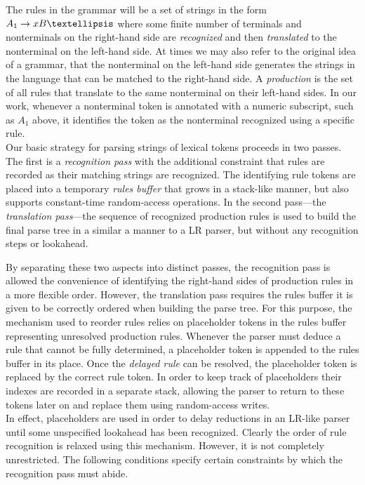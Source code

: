 \documentclass[a4paper,11pt]{article}
\begin{document}
The rules in the grammar will be a set of strings in the form $A_1 \rightarrow x B \textellipsis$ where some finite number of terminals and nonterminals on the right-hand side are \emph{recognized} and then \emph{translated} to the nonterminal on the left-hand side.
At times we may also refer to the original idea of a grammar, that the nonterminal on the left-hand side generates the strings in the language that can be matched to the right-hand side.
A \emph{production} is the set of all rules that translate to the same nonterminal on their left-hand sides.
In our work, whenever a nonterminal token is annotated with a numeric subscript, such as $A_1$ above, it identifies the token as the nonterminal recognized using a specific rule.\\

Our basic strategy for parsing strings of lexical tokens proceeds in two passes.
The first is a \emph{recognition pass} with the additional constraint that rules are recorded as their matching strings are recognized.
The identifying rule tokens are placed into a temporary \emph{rules buffer} that grows in a stack-like manner, but also supports constant-time random-access operations.
In the second pass---the \emph{translation pass}---the sequence of recognized production rules is used to build the final parse tree in a similar a manner to a LR parser, but without any recognition steps or lookahead.

By separating these two aspects into distinct passes, the recognition pass is allowed the convenience of identifying the right-hand sides of production rules in a more flexible order. 
However, the translation pass requires the rules buffer it is given to be correctly ordered when building the parse tree.
For this purpose, the mechanism used to reorder rules relies on placeholder tokens in the rules buffer representing unresolved production rules.
Whenever the parser must deduce a rule that cannot be fully determined, a placeholder token is appended to the rules buffer in its place. 
Once the \emph{delayed rule} can be resolved, the placeholder token is replaced by the correct rule token.
In order to keep track of placeholders their indexes are recorded in a separate stack, allowing the parser to return to these tokens later on and replace them using random-access writes.\\

In effect, placeholders are used in order to delay reductions in an LR-like parser until some unspecified lookahead has been recognized.
Clearly the order of rule recognition is relaxed using this mechanism.
However, it is not completely unrestricted.
The following conditions specify certain constraints by which the recognition pass must abide.
\end{document}

